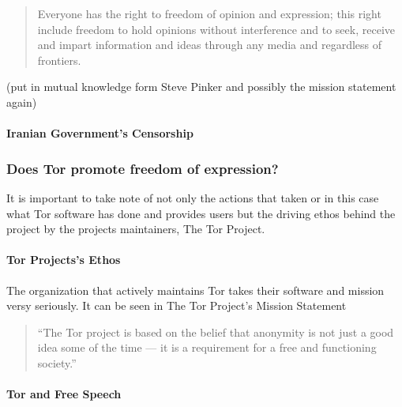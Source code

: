 \documentclass[11pt]{article}
\begin{document}
\begin{multicols}{2}
\begin{quotation} Everyone has the right to freedom of opinion and expression;
  this right include freedom to hold opinions without interference and to seek,
  receive and impart information and ideas through any media and regardless of
  frontiers.  \cite{UniversalDeclerationOfHumanRights}
\end{quotation}

(put in mutual knowledge form Steve Pinker and possibly the mission statement
again)


\paragraph{Iranian Government's Censorship}


\subsubsection{Does Tor promote freedom of expression?}

It is important to take note of not only the actions that taken or in this case
what Tor software has done and provides users but the driving ethos behind the
project by the projects maintainers, The Tor Project.

\paragraph{Tor Projects's Ethos}

The organization that actively maintains Tor takes their software and mission
versy seriously. It can be seen in The Tor Project's Mission Statement


\begin{quotation} 
  
  ``The Tor project is based on the belief that anonymity is not just a good
  idea some of the time — it is a requirement for a free and functioning
  society.''\cite{Tor:Users}

\end{quotation}



%

\paragraph{Tor and Free Speech}


\end{multicols}
\end{document}
